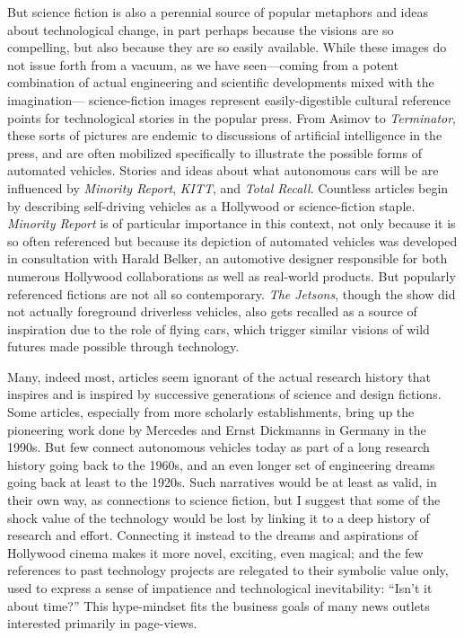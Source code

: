 But science fiction is also a perennial source of popular metaphors and ideas
about technological change, in part perhaps because the visions are so
compelling, but also because they are so easily available. While these images
do not issue forth from a vacuum, as we have seen---coming from a potent combination
of actual engineering and scientific developments mixed with the imagination---
science-fiction images represent easily-digestible cultural reference
points for technological stories in the popular press. From Asimov to \emph{Terminator},
these sorts of pictures are endemic to discussions of artificial
intelligence in the press, and are often mobilized specifically to
illustrate the possible forms of automated vehicles. Stories and ideas
about what autonomous cars will be are
influenced by \emph{Minority Report}\cite{fromHollywood}, \emph{KITT}\cite{wadeKITT}, and \emph{Total
  Recall}.\cite{pasdirtzSolution} Countless articles begin by describing
self-driving vehicles as a Hollywood or science-fiction
staple.\cite{scifiToReality} \emph{Minority Report} is of particular
importance in this context, not only because it is so often referenced
but because its depiction of automated vehicles was developed in
consultation with Harald Belker, an automotive designer responsible
for both numerous Hollywood collaborations as well as real-world
products.\cite{melansonMinority} But popularly referenced fictions are
not all so contemporary. \emph{The Jetsons}, though
the show did not actually foreground driverless vehicles, also gets
recalled as a source of inspiration due to the role of flying cars,
which trigger similar visions of wild 
futures made possible through technology.\cite{JetsonsAge} 


Many, indeed most, articles seem ignorant of the actual research
history that inspires and is inspired by successive generations of
science and design fictions. Some articles, especially from more
scholarly establishments, bring up 
the pioneering work done by Mercedes and Ernst
Dickmanns in Germany in the 1990s.\cite{HCRIDriverless} But few connect
autonomous vehicles today as part of a long research history going
back to the 1960s, and an even longer set of engineering dreams going
back at least to the 1920s. Such narratives would be at least as
valid, in their own way, as connections to science fiction, but I
suggest that some of the shock value of the technology would be lost
by linking it to a deep history of research and effort. Connecting it
instead to the dreams and aspirations of Hollywood cinema makes it
more novel, exciting, even magical; and the few references to past
technology projects are relegated to their symbolic value only, used
to express a sense of impatience and technological inevitability: ``Isn't
it about time?'' This hype-mindset fits the business
goals of many news outlets interested primarily in page-views.

